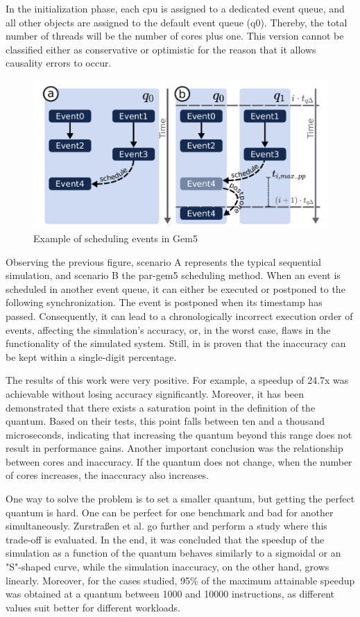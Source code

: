 In the initialization phase, each \gls{cpu} is assigned to a dedicated event queue, and all other objects are assigned to the default event 
queue (q0). Thereby, the total number of threads will be the number of cores plus one. This version cannot be classified either as conservative 
or optimistic for the reason that it allows causality errors to occur.

\begin{figure}[H]
	\centering
 	\includegraphics[width=0.7\linewidth]{Images/SchedulingEventGem5.png}
 	\caption{Example of scheduling events in Gem5 \cite{pargem5}}
	 \label{fig_SchedulingEventGem5}
\end{figure}

Observing the previous figure, scenario A represents the typical sequential simulation, and scenario B the par-gem5 scheduling method. 
When an event is scheduled in another event queue,
it can either be executed or postponed to the following synchronization. The event is postponed when its timestamp has passed. 
Consequently, it can lead to a chronologically incorrect execution order of events, affecting the simulation's accuracy, or, in the worst case, 
flaws in the functionality of the simulated system. Still, in \cite{pargem5} is proven that the inaccuracy can be kept within a single-digit 
percentage.

The results of this work were very positive. For example, a speedup of 24.7x was achievable without losing accuracy significantly. Moreover, 
it has been demonstrated that there exists a saturation point in the definition of the quantum. Based on their tests, this point falls between 
ten and a thousand microseconds, indicating that increasing the quantum beyond this range does not result in performance gains. Another 
important conclusion was the relationship between cores and inaccuracy. If the quantum does not change, when the number of cores increases, the 
inaccuracy also increases. 

One way to solve the problem is to set a smaller quantum, but getting the perfect quantum is hard. One can be perfect for one benchmark and 
bad for another simultaneously. Zurstraßen et al. \cite{BeyondQuantumTDSim} go further and perform a study where this trade-off is evaluated. 
In the end, it was concluded that the speedup of the simulation as a function of the quantum behaves similarly to a sigmoidal or an "S"-shaped curve, 
while the simulation inaccuracy, on the other hand, grows linearly. Moreover, for the cases studied, 95\% of the maximum attainable speedup was 
obtained at a quantum between 1000 and 10000 instructions, as different values suit better for different workloads.

